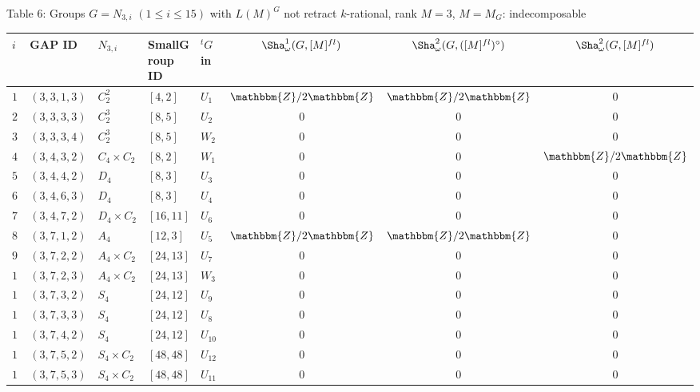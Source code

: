 \documentclass{amsart}
\theoremstyle{plain}
\theoremstyle{definition}
\theoremstyle{remark}
\newcommand{\bZ}{\mathbbm{Z}}\newcommand{\bQ}{\mathbbm{Q}}
\begin{document}
Table $6$: 
Groups $G=N_{3,i}$ $(1\leq i\leq 15)$ 
with $L(M)^G$ not retract $k$-rational, 
rank $M=3$, $M=M_G$: indecomposable 
{\small 
\begin{longtable}{lllll|ccc}
$i$ & GAP ID & $N_{3,i}$ & SmallGroup ID & ${}^tG$ in \cite{Kun90} 
& $\Sha^1_\omega(G,[M]^{fl})$ & $\Sha^2_\omega(G,([M]^{fl})^\circ)$ & $\Sha^2_\omega(G,[M]^{fl})$\\\hline
\endfirsthead
%
$1$ & $( 3, 3, 1, 3 )$ & $C_2^2$ & $[ 4, 2 ]$ & $U_1$ & $\bZ/2\bZ$ & $\bZ/2\bZ$ & $0$\\
$2$ & $( 3, 3, 3, 3 )$ & $C_2^3$ & $[ 8, 5 ]$ & $U_2$& $0$ & $0$ & $0$\\
$3$ & $( 3, 3, 3, 4 )$ & $C_2^3$ & $[ 8, 5 ]$ & $W_2$& $0$ & $0$ & $0$\\
$4$ & $( 3, 4, 3, 2 )$ & $C_4 \times C_2$ & $[ 8, 2 ]$ & $W_1$& $0$ & $0$ & $\bZ/2\bZ$\\
$5$ & $( 3, 4, 4, 2 )$ & $D_4$ & $[ 8, 3 ]$ & $U_3$& $0$ & $0$ & $0$\\
$6$ & $( 3, 4, 6, 3 )$ & $D_4$ & $[ 8, 3 ]$ & $U_4$& $0$ & $0$ & $0$\\
$7$ & $( 3, 4, 7, 2 )$ & $D_4\times C_2$ & $[ 16, 11 ]$ & $U_6$& $0$ & $0$ & $0$\\
$8$ & $( 3, 7, 1, 2 )$ & $A_4$ & $[ 12, 3 ]$ & $U_5$& $\bZ/2\bZ$ & $\bZ/2\bZ$ & $0$\\
$9$ & $( 3, 7, 2, 2 )$ & $A_4\times C_2$ & $[ 24, 13 ]$ & $U_7$& $0$ & $0$ & $0$\\
$10$ & $( 3, 7, 2, 3 )$ & $A_4\times C_2$ & $[ 24, 13 ]$ & $W_3$& $0$ & $0$ & $0$\\
$11$ & $( 3, 7, 3, 2 )$ & $S_4$ & $[ 24, 12 ]$ & $U_9$& $0$ & $0$ & $0$\\
$12$ & $( 3, 7, 3, 3 )$ & $S_4$ & $[ 24, 12 ]$ & $U_8$& $0$ & $0$ & $0$\\
$13$ & $( 3, 7, 4, 2 )$ & $S_4$ & $[ 24, 12 ]$ & $U_{10}$& $0$ & $0$ & $0$\\
$14$ & $( 3, 7, 5, 2 )$ & $S_4\times C_2$ & $[ 48, 48 ]$ & $U_{12}$& $0$ & $0$ & $0$\\
$15$ & $( 3, 7, 5, 3 )$ & $S_4\times C_2$ & $[ 48, 48 ]$ & $U_{11}$ & $0$ & $0$ & $0$
\end{longtable}
}
\vspace*{2mm}
\end{document}
